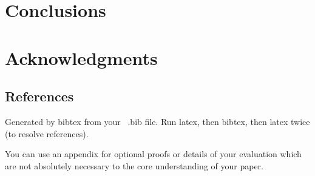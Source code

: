 \documentclass{vldb}
\begin{document}
\section{Conclusions}

\balance

\section{Acknowledgments}




\subsection{References}
Generated by bibtex from your ~.bib file.  Run latex,
then bibtex, then latex twice (to resolve references).


\begin{appendix}
You can use an appendix for optional proofs or details of your evaluation which are not absolutely necessary to the core understanding of your paper. 


\end{appendix}
\end{document}
